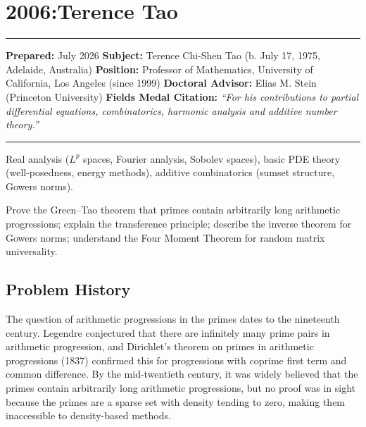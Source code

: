\chapter{2006:Terence Tao}\label{ch2006terencetao:terence-tao-fields-medal-2006-a-comprehensive-report-on-his-work-and-impact}

\begin{center}\rule{0.5\linewidth}{0.5pt}\end{center}

\textbf{Prepared:} July 2026 \textbf{Subject:} Terence Chi-Shen Tao (b. July 17, 1975, Adelaide, Australia) \textbf{Position:} Professor of Mathematics, University of California, Los Angeles (since 1999) \textbf{Doctoral Advisor:} Elias M. Stein (Princeton University) \textbf{Fields Medal Citation:} \emph{``For his contributions to partial differential equations, combinatorics, harmonic analysis and additive number theory.''}

\begin{center}\rule{0.5\linewidth}{0.5pt}\end{center}

\begin{prereqs} Real analysis ($L^p$ spaces, Fourier analysis, Sobolev spaces), basic PDE theory (well-posedness, energy methods), additive combinatorics (sumset structure, Gowers norms). \end{prereqs}

\begin{objectives} Prove the Green--Tao theorem that primes contain arbitrarily long arithmetic progressions; explain the transference principle; describe the inverse theorem for Gowers norms; understand the Four Moment Theorem for random matrix universality. \end{objectives}

\section{Problem History}

The question of arithmetic progressions in the primes dates to the nineteenth century. Legendre conjectured that there are infinitely many prime pairs in arithmetic progression, and Dirichlet's theorem on primes in arithmetic progressions (1837) confirmed this for progressions with coprime first term and common difference. By the mid-twentieth century, it was widely believed that the primes contain arbitrarily long arithmetic progressions, but no proof was in sight because the primes are a sparse set with density tending to zero, making them inaccessible to density-based methods.

